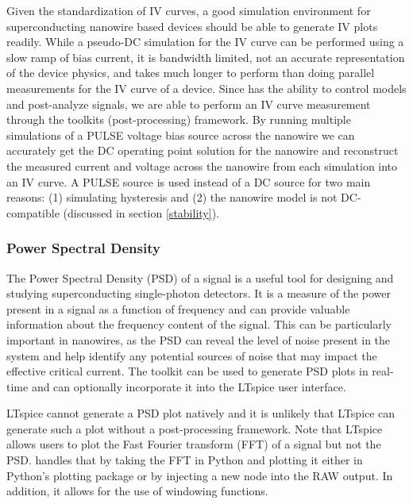 Given the standardization of IV curves, a good simulation environment for superconducting nanowire based devices
should be able to generate IV plots readily. While a pseudo-DC simulation for the IV curve can be performed
using a slow ramp of bias current, it is bandwidth limited, not an accurate representation of the device physics, 
and takes much longer to perform than doing parallel measurements for the IV curve of a device. Since 
has the ability to control models and post-analyze signals, we are able to perform an IV curve measurement through
the  toolkits (post-processing) framework. By running multiple simulations of a PULSE voltage bias source across the nanowire
we can accurately get the DC operating point solution for the nanowire and reconstruct the measured current and voltage
across the nanowire from each simulation into an IV curve. A PULSE source is used instead of a DC 
source for two main reasons: (1) 
simulating hysteresis and (2) the nanowire model is not DC-compatible (discussed in section \ref{stability}).


\subsubsection{Power Spectral Density}

The Power Spectral Density (PSD) of a signal is a useful tool for designing and studying
superconducting single-photon detectors. It is a 
measure of the power present in a signal as a function of frequency and can provide valuable information about 
the frequency content of the signal. This can be particularly important in nanowires, 
as the PSD can reveal the level of noise present in the system and help identify any 
potential sources of noise that may impact the effective critical current. 
The  toolkit can be used to generate PSD plots in real-time and can 
optionally incorporate it into the LTspice user interface.

LTspice cannot generate a PSD plot natively and it is unlikely that LTspice
 can generate such a plot without a post-processing framework.
Note that LTspice allows users to plot the Fast Fourier transform (FFT) of a signal but not the 
PSD.  handles that by taking the FFT in Python and plotting it either in Python's 
plotting package  or by injecting a new node into the RAW output. In addition,
it allows for the use of windowing functions.

